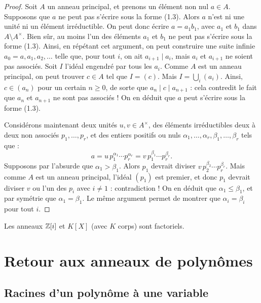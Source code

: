 \documentclass[]{report}
\begin{document}
\begin{proof}
    Soit $A$ un anneau principal, et prenons un élément non nul $a \in A$. Supposons que $a$ ne peut pas s'écrire sous la forme (1.3). Alors $a$ n'est ni une unité ni un élément irréductible. On peut donc écrire $a = a_1 b_1$, avec $a_1$ et $b_1$ dans $A \setminus A^{\times}$. Bien sûr, au moins l'un des éléments $a_1$ et $b_1$ ne peut pas s'écrire sous la forme (1.3). Ainsi, en répétant cet argument, on peut construire une suite infinie $a_0 = a, a_1, a_2, \ldots$ telle que, pour tout $i$, on ait $a_{i+1} \mid a_i$, mais $a_i$ et $a_{i+1}$ ne soient pas associés. Soit $I$ l'idéal engendré par tous les $a_i$. Comme $A$ est un anneau principal, on peut trouver $c \in A$ tel que $I = (c)$. Mais $I = \bigcup_i (a_i)$. Ainsi, $c \in (a_n)$ pour un certain $n \ge 0$, de sorte que $a_n \mid c \mid a_{n+1}$ : cela contredit le fait que $a_n$ et $a_{n+1}$ ne sont pas associés ! On en déduit que $a$ peut s'écrire sous la forme (1.3).

    Considérons maintenant deux unités $u, v \in A^{\times}$, des éléments irréductibles deux à deux non associés $p_1, \ldots, p_r$, et des entiers positifs ou nuls $\alpha_1, \ldots, \alpha_r, \beta_1, \ldots, \beta_r$ tels que :
    \[a = u \, p_1^{\alpha_1} \cdots p_r^{\alpha_r} = v \, p_1^{\beta_1} \cdots p_r^{\beta_r}.\]
    Supposons par l'absurde que $\alpha_1 > \beta_1$. Alors $p_1$ devrait diviser $v \, p_2^{\beta_2} \cdots p_r^{\beta_r}$. Mais comme $A$ est un anneau principal, l'idéal $(p_1)$ est premier, et donc $p_1$ devrait diviser $v$ ou l'un des $p_i$ avec $i \ne 1$ : contradiction ! On en déduit que $\alpha_1 \le \beta_1$, et par symétrie que $\alpha_1 = \beta_1$. Le même argument permet de montrer que $\alpha_i = \beta_i$ pour tout $i$.
\end{proof}

\begin{cor}{}{}
    Les anneaux $\mathbb{Z}[i]$ et $K[X]$ (avec $K$ corps) sont factoriels.
\end{cor}

\section{Retour aux anneaux de polynômes}

\subsection{Racines d'un polynôme à une variable}
\end{document}
